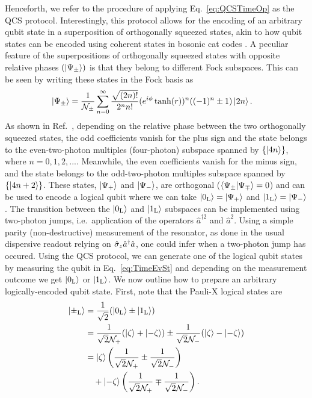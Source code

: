 Henceforth, we refer to the procedure of applying Eq.~\eqref{eq:QCSTimeOp} as the QCS protocol. Interestingly, this protocol allows for the encoding of an arbitrary qubit state in a superposition of orthogonally squeezed states,  akin to how qubit states can be encoded using coherent states in bosonic cat codes \cite{CochraneCatCode,qcMAP,girvin2017schrodinger}.
{A peculiar feature of the superpositions of orthogonally squeezed states with opposite relative phases {$(\ket{\Psi_\pm})$} is that they {belong to} different Fock subspaces. This can be seen by writing these states in the Fock basis as \begin{align}
    \ket{\Psi_\pm}&=\frac{1}{\mathcal{N}_\pm} \sum_{n=0}^\infty \frac{\sqrt{(2n)!}}{2^n n!}(e^{i\phi}\tanh(r))^n ( (-1)^n \pm 1) \ket{2n}.
\end{align}
As shown in Ref.~\cite{BCSanders_SqueezedSuperposition}, depending on the relative phase between the two orthogonally squeezed states, the odd coefficients vanish for the plus sign and the state belongs to the even-two-photon multiples (four-photon) subspace spanned by $\{\ket{4n}\}$, where $n=0, 1, 2, ...$. Meanwhile, the even coefficients vanish for the minus sign, and the state belongs to the odd-two-photon multiples subspace spanned by $\{ \ket{4n+2}\}$. These states, $\ket{\Psi_+}$ and $\ket{\Psi_-}$, are orthogonal ($\braket{\Psi_\pm}{\Psi_\mp}=0$) and can be used to encode a logical qubit where we can take $\ket{0_{\text{L}}}=\ket{\Psi_+}$ and $\ket{1_{\text{L}}}=\ket{\Psi_-}$. The transition between the $\ket{0_{\text{L}}}$ and $\ket{1_{\text{L}}}$ subspaces can be implemented using two-photon jumps, i.e.~application of the operators $\hat{a}^{\dagger 2}$ and $\hat{a}^2$. Using a simple parity (non-destructive) measurement of the resonator, as done in the usual dispersive readout relying on $\hat{\sigma}_z\hat{a}^\dagger\hat{a}$, one could infer when a two-photon jump has occured. Using the QCS protocol, we can generate one of the logical qubit states by measuring the qubit in Eq.~\eqref{eq:TimeEvSt} and depending on the measurement outcome we get $\ket{0_{\text{L}}}$ or $\ket{1_\text{L}}$. We now outline how to prepare an arbitrary logically-encoded qubit state. First, note that the Pauli-X logical states are
\begin{align}
    \ket{\pm_{\text{L}}}&=\frac{1}{\sqrt{2}}(\ket{0_{\text{L}}}\pm\ket{1_{\text{L}}})\nonumber\\ &= \frac{1}{\sqrt{2}\mathcal{N}_+}(\ket{\zeta} +\ket{-\zeta} ) \pm \frac{1}{\sqrt{2}\mathcal{N}_-}(\ket{\zeta} -\ket{-\zeta})\nonumber\\ &= \ket{\zeta}\left(\frac{1}{\sqrt{2}\mathcal{N}_+}\pm \frac{1}{\sqrt{2}\mathcal{N}_-}\right) \nonumber\\ &\,\,\,\,\,\,+\ket{-\zeta}\left(\frac{1}{\sqrt{2}\mathcal{N}_+}\mp\frac{1}{\sqrt{2}\mathcal{N}_-}\right).

\end{align}}
